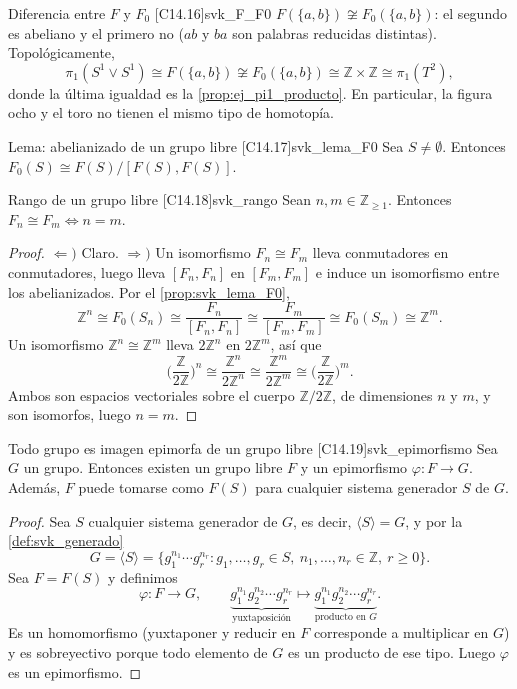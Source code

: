 \begin{observacion}{Diferencia entre $F$ y $F_0$ [C14.16]}{svk_F_F0}
$F(\{a,b\}) \not\cong F_0(\{a,b\})$: el segundo es abeliano y el primero no ($ab$ y $ba$ son palabras reducidas distintas). Topológicamente,
\[ \pi_1(S^1 \vee S^1) \cong F(\{a,b\}) \not\cong F_0(\{a,b\}) \cong \mathbb{Z} \times \mathbb{Z} \cong \pi_1(T^2), \]
donde la última igualdad es la \cref{prop:ej_pi1_producto}. En particular, la figura ocho y el toro no tienen el mismo tipo de homotopía.
\end{observacion}

\begin{proposicion}{Lema: abelianizado de un grupo libre [C14.17]}{svk_lema_F0}
Sea $S \neq \emptyset$. Entonces $F_0(S) \cong F(S)/[F(S), F(S)]$.
\end{proposicion}

\begin{teorema}{Rango de un grupo libre [C14.18]}{svk_rango}
Sean $n, m \in \mathbb{Z}_{\geq 1}$. Entonces $F_n \cong F_m \iff n = m$.
\end{teorema}

\begin{proof}
$\Leftarrow)$ Claro. $\Rightarrow)$ Un isomorfismo $F_n \cong F_m$ lleva conmutadores en conmutadores, luego lleva $[F_n,F_n]$ en $[F_m,F_m]$ e induce un isomorfismo entre los abelianizados. Por el \cref{prop:svk_lema_F0},
\[ \mathbb{Z}^n \cong F_0(S_n) \cong \frac{F_n}{[F_n,F_n]} \cong \frac{F_m}{[F_m,F_m]} \cong F_0(S_m) \cong \mathbb{Z}^m. \]
Un isomorfismo $\mathbb{Z}^n \cong \mathbb{Z}^m$ lleva $2\mathbb{Z}^n$ en $2\mathbb{Z}^m$, así que
\[ \Big(\frac{\mathbb{Z}}{2\mathbb{Z}}\Big)^n \cong \frac{\mathbb{Z}^n}{2\mathbb{Z}^n} \cong \frac{\mathbb{Z}^m}{2\mathbb{Z}^m} \cong \Big(\frac{\mathbb{Z}}{2\mathbb{Z}}\Big)^m. \]
Ambos son espacios vectoriales sobre el cuerpo $\mathbb{Z}/2\mathbb{Z}$, de dimensiones $n$ y $m$, y son isomorfos, luego $n = m$.
\end{proof}

\begin{teorema}{Todo grupo es imagen epimorfa de un grupo libre [C14.19]}{svk_epimorfismo}
Sea $G$ un grupo. Entonces existen un grupo libre $F$ y un epimorfismo $\varphi \colon F \to G$. Además, $F$ puede tomarse como $F(S)$ para cualquier sistema generador $S$ de $G$.
\end{teorema}

\begin{proof}
Sea $S$ cualquier sistema generador de $G$, es decir, $\langle S \rangle = G$, y por la \cref{def:svk_generado}
\[ G = \langle S \rangle = \{ g_1^{n_1} \cdots g_r^{n_r} : g_1, \dots, g_r \in S,\ n_1, \dots, n_r \in \mathbb{Z},\ r \geq 0 \}. \]
Sea $F = F(S)$ y definimos
\[ \varphi \colon F \to G, \qquad \underbrace{g_1^{n_1} g_2^{n_2} \cdots g_r^{n_r}}_{\text{yuxtaposición}} \longmapsto \underbrace{g_1^{n_1} g_2^{n_2} \cdots g_r^{n_r}}_{\text{producto en } G}. \]
Es un homomorfismo (yuxtaponer y reducir en $F$ corresponde a multiplicar en $G$) y es sobreyectivo porque todo elemento de $G$ es un producto de ese tipo. Luego $\varphi$ es un epimorfismo.
\end{proof}

